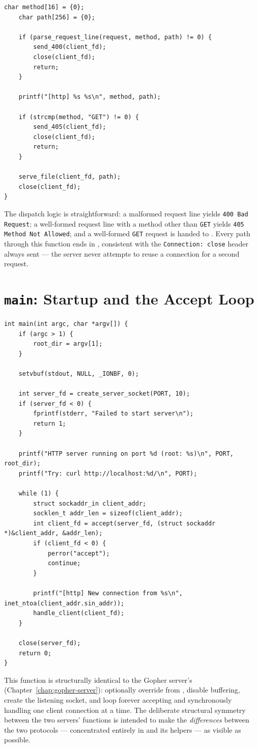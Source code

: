 \begin{lstlisting}[style=cstyle]
    char method[16] = {0};
    char path[256] = {0};

    if (parse_request_line(request, method, path) != 0) {
        send_400(client_fd);
        close(client_fd);
        return;
    }

    printf("[http] %s %s\n", method, path);

    if (strcmp(method, "GET") != 0) {
        send_405(client_fd);
        close(client_fd);
        return;
    }

    serve_file(client_fd, path);
    close(client_fd);
}
\end{lstlisting}

The dispatch logic is straightforward: a malformed request line yields \texttt{400 Bad Request}; a well-formed request line with a method other than \texttt{GET} yields \texttt{405 Method Not Allowed}; and a well-formed \texttt{GET} request is handed to . Every path through this function ends in , consistent with the \texttt{Connection: close} header always sent --- the server never attempts to reuse a connection for a second request.

\section{\texttt{main}: Startup and the Accept Loop}

\begin{lstlisting}[style=cstyle]
int main(int argc, char *argv[]) {
    if (argc > 1) {
        root_dir = argv[1];
    }

    setvbuf(stdout, NULL, _IONBF, 0);

    int server_fd = create_server_socket(PORT, 10);
    if (server_fd < 0) {
        fprintf(stderr, "Failed to start server\n");
        return 1;
    }

    printf("HTTP server running on port %d (root: %s)\n", PORT, root_dir);
    printf("Try: curl http://localhost:%d/\n", PORT);

    while (1) {
        struct sockaddr_in client_addr;
        socklen_t addr_len = sizeof(client_addr);
        int client_fd = accept(server_fd, (struct sockaddr *)&client_addr, &addr_len);
        if (client_fd < 0) {
            perror("accept");
            continue;
        }

        printf("[http] New connection from %s\n", inet_ntoa(client_addr.sin_addr));
        handle_client(client_fd);
    }

    close(server_fd);
    return 0;
}
\end{lstlisting}

This function is structurally identical to the Gopher server's  (Chapter~\ref{chap:gopher-server}): optionally override  from , disable  buffering, create the listening socket, and loop forever accepting and synchronously handling one client connection at a time. The deliberate structural symmetry between the two servers'  functions is intended to make the \emph{differences} between the two protocols --- concentrated entirely in  and its helpers --- as visible as possible.
